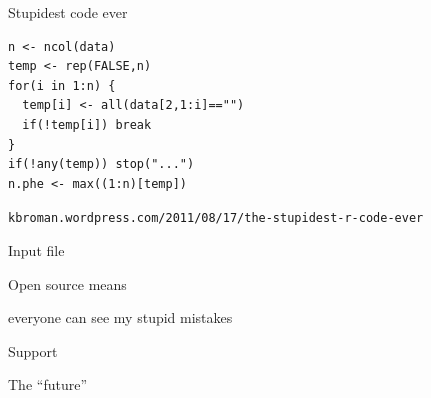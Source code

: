 \documentclass[12pt,t]{beamer}
\begin{document}
\begin{frame}[c,fragile]{Stupidest code ever}

\begin{center}
\begin{minipage}[c]{9.3cm}
\begin{semiverbatim}
\lstset{basicstyle=\normalsize}
\begin{lstlisting}[linewidth=9.3cm]
n <- ncol(data)
temp <- rep(FALSE,n)
for(i in 1:n) {
  temp[i] <- all(data[2,1:i]=="")
  if(!temp[i]) break
}
if(!any(temp)) stop("...")
n.phe <- max((1:n)[temp])
\end{lstlisting}
\end{semiverbatim}
\end{minipage}
\end{center}

\vspace{3mm}

\hfill {\scriptsize \color{lolit} \tt kbroman.wordpress.com/2011/08/17/the-stupidest-r-code-ever}

\end{frame}


\begin{frame}[c]{Input file}


\end{frame}


\begin{frame}[c]{}

  \large

  {\hilit Open source} {\lolit means}

  everyone can see my stupid mistakes

  \bigskip \bigskip \bigskip


\end{frame}



\begin{frame}{}

\vspace*{16.7mm}

\centerline{\Large Support}

\end{frame}


\begin{frame}[c]{The ``future''}


\end{frame}
\end{document}
